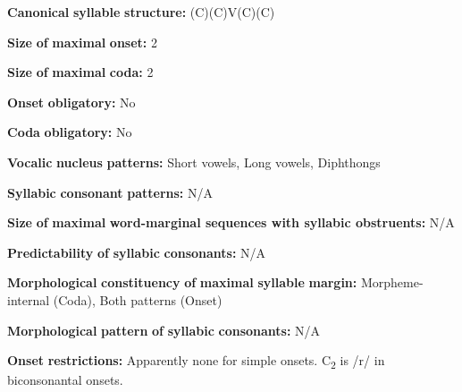 \begin{styleBody}
\textbf{Canonical} \textbf{syllable} \textbf{structure:} (C)(C)V(C)(C) \citep[20-21]{Holt1999}
\end{styleBody}

\begin{styleBody}
\textbf{Size} \textbf{of} \textbf{maximal} \textbf{onset:} 2
\end{styleBody}

\begin{styleBody}
\textbf{Size} \textbf{of} \textbf{maximal} \textbf{coda:} 2
\end{styleBody}

\begin{styleBody}
\textbf{Onset} \textbf{obligatory:} No
\end{styleBody}

\begin{styleBody}
\textbf{Coda} \textbf{obligatory:} No
\end{styleBody}

\begin{styleBody}
\textbf{Vocalic} \textbf{nucleus} \textbf{patterns:} Short vowels, Long vowels, Diphthongs
\end{styleBody}

\begin{styleBody}
\textbf{Syllabic} \textbf{consonant} \textbf{patterns:} N/A
\end{styleBody}

\begin{styleBody}
\textbf{Size} \textbf{of} \textbf{maximal} \textbf{word{}-marginal sequences with syllabic obstruents:} N/A
\end{styleBody}

\begin{styleBody}
\textbf{Predictability} \textbf{of} \textbf{syllabic} \textbf{consonants:} N/A
\end{styleBody}

\begin{styleBody}
\textbf{Morphological} \textbf{constituency} \textbf{of} \textbf{maximal} \textbf{syllable} \textbf{margin:} Morpheme-internal (Coda), Both patterns (Onset)
\end{styleBody}

\begin{styleBody}
\textbf{Morphological} \textbf{pattern} \textbf{of} \textbf{syllabic} \textbf{consonants:} N/A
\end{styleBody}

\begin{styleBody}
\textbf{Onset} \textbf{restrictions:} Apparently none for simple onsets. C\textsubscript{2} is /r/ in biconsonantal onsets.
\end{styleBody}

